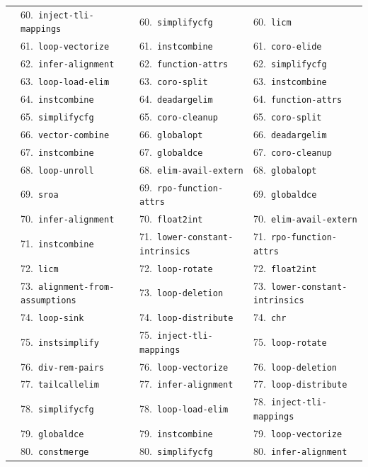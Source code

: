 \documentclass[11pt,a4paper]{article}
\begin{document}
{\begin{longtable}{llll}
 & 60.~\texttt{inject-tli-mappings} & 60.~\texttt{simplifycfg} & 60.~\texttt{licm} \\
 & 61.~\texttt{loop-vectorize} & 61.~\texttt{instcombine} & 61.~\texttt{coro-elide} \\
 & 62.~\texttt{infer-alignment} & 62.~\texttt{function-attrs} & 62.~\texttt{simplifycfg} \\
 & 63.~\texttt{loop-load-elim} & 63.~\texttt{coro-split} & 63.~\texttt{instcombine} \\
 & 64.~\texttt{instcombine} & 64.~\texttt{deadargelim} & 64.~\texttt{function-attrs} \\
 & 65.~\texttt{simplifycfg} & 65.~\texttt{coro-cleanup} & 65.~\texttt{coro-split} \\
 & 66.~\texttt{vector-combine} & 66.~\texttt{globalopt} & 66.~\texttt{deadargelim} \\
 & 67.~\texttt{instcombine} & 67.~\texttt{globaldce} & 67.~\texttt{coro-cleanup} \\
 & 68.~\texttt{loop-unroll} & 68.~\texttt{elim-avail-extern} & 68.~\texttt{globalopt} \\
 & 69.~\texttt{sroa} & 69.~\texttt{rpo-function-attrs} & 69.~\texttt{globaldce} \\
 & 70.~\texttt{infer-alignment} & 70.~\texttt{float2int} & 70.~\texttt{elim-avail-extern} \\
 & 71.~\texttt{instcombine} & 71.~\texttt{lower-constant-intrinsics} & 71.~\texttt{rpo-function-attrs} \\
 & 72.~\texttt{licm} & 72.~\texttt{loop-rotate} & 72.~\texttt{float2int} \\
 & 73.~\texttt{alignment-from-assumptions} & 73.~\texttt{loop-deletion} & 73.~\texttt{lower-constant-intrinsics} \\
 & 74.~\texttt{loop-sink} & 74.~\texttt{loop-distribute} & 74.~\texttt{chr} \\
 & 75.~\texttt{instsimplify} & 75.~\texttt{inject-tli-mappings} & 75.~\texttt{loop-rotate} \\
 & 76.~\texttt{div-rem-pairs} & 76.~\texttt{loop-vectorize} & 76.~\texttt{loop-deletion} \\
 & 77.~\texttt{tailcallelim} & 77.~\texttt{infer-alignment} & 77.~\texttt{loop-distribute} \\
 & 78.~\texttt{simplifycfg} & 78.~\texttt{loop-load-elim} & 78.~\texttt{inject-tli-mappings} \\
 & 79.~\texttt{globaldce} & 79.~\texttt{instcombine} & 79.~\texttt{loop-vectorize} \\
 & 80.~\texttt{constmerge} & 80.~\texttt{simplifycfg} & 80.~\texttt{infer-alignment} \\

\end{longtable}}
\end{document}
